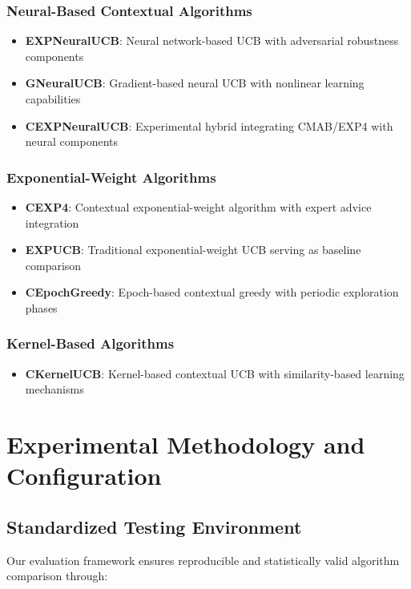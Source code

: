 \documentclass[12pt,a4paper]{article}
\begin{document}
\subsubsection{Neural-Based Contextual Algorithms}
\begin{itemize}
\item \textbf{EXPNeuralUCB}: Neural network-based UCB with adversarial robustness components
\item \textbf{GNeuralUCB}: Gradient-based neural UCB with nonlinear learning capabilities
\item \textbf{CEXPNeuralUCB}: Experimental hybrid integrating CMAB/EXP4 with neural components
\end{itemize}

\subsubsection{Exponential-Weight Algorithms}
\begin{itemize}
\item \textbf{CEXP4}: Contextual exponential-weight algorithm with expert advice integration
\item \textbf{EXPUCB}: Traditional exponential-weight UCB serving as baseline comparison
\item \textbf{CEpochGreedy}: Epoch-based contextual greedy with periodic exploration phases
\end{itemize}

\subsubsection{Kernel-Based Algorithms}
\begin{itemize}
\item \textbf{CKernelUCB}: Kernel-based contextual UCB with similarity-based learning mechanisms
\end{itemize}

\section{Experimental Methodology and Configuration}

\subsection{Standardized Testing Environment}

Our evaluation framework ensures reproducible and statistically valid algorithm comparison through:
\end{document}
